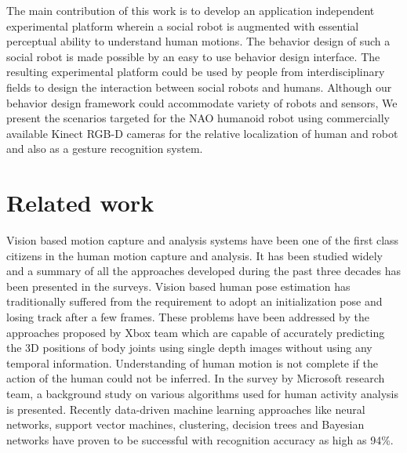 \documentclass{llncs}
\begin{document}
The main contribution of this work is to develop an application independent experimental platform wherein a social robot is augmented with essential perceptual ability to understand human motions. The behavior design of such a social robot is made possible by an easy to use behavior design interface. The resulting experimental platform could be used by people from interdisciplinary fields to design the interaction between social robots and humans. Although our behavior design framework could accommodate variety of robots and sensors, We present the scenarios targeted for the NAO\cite{NaoTheRobot} humanoid robot using commercially available Kinect\cite{Kinect2014} RGB-D cameras for the relative localization of human and robot and also as a gesture recognition system. 
\section{Related work}
	Vision based motion capture and analysis systems have been one of the first class citizens in the human motion capture and analysis. It has been studied widely and a summary of all the approaches developed during the past three decades has been presented in the surveys\cite{Moeslund200690}\cite{Poppe20074}. Vision based human pose estimation has traditionally suffered from the requirement to adopt an initialization pose and losing track after a few frames. These problems have been addressed by the approaches proposed by Xbox\cite{Kinect2014} team which are capable of accurately predicting the 3D positions of body joints using single depth images without using any temporal information\cite{Shotton2013}. Understanding of human motion is not complete if the action of the human could not be inferred. In the survey by Microsoft research team\cite{KinectCV2013}, a background study on various algorithms used for human activity analysis is presented. Recently data-driven machine learning approaches like neural networks, support vector machines, clustering, decision trees and Bayesian networks have proven to be successful with recognition accuracy as high as 94\%\cite{Kinect2014}.
	
\end{document}
